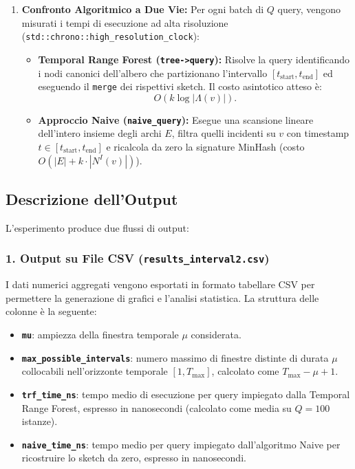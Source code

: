 \begin{enumerate}
    \item \textbf{Confronto Algoritmico a Due Vie:}
    Per ogni batch di $Q$ query, vengono misurati i tempi di esecuzione ad alta risoluzione (\texttt{std::chrono::high\_resolution\_clock}):
    \begin{itemize}
        \item \textbf{Temporal Range Forest (\texttt{tree->query}):} Risolve la query identificando i nodi canonici dell'albero che partizionano l'intervallo $[t_{\text{start}}, t_{\text{end}}]$ ed eseguendo il \texttt{merge} dei rispettivi sketch. Il costo asintotico atteso è:
        \[
        O(k \log |\Lambda(v)|).
        \]
        \item \textbf{Approccio Naive (\texttt{naive\_query}):} Esegue una scansione lineare dell'intero insieme degli archi $E$, filtra quelli incidenti su $v$ con timestamp $t \in [t_{\text{start}}, t_{\text{end}}]$ e ricalcola da zero la signature MinHash (costo $O(|E| + k \cdot |N^I(v)|)$).
    \end{itemize}
\end{enumerate}

\subsection{Descrizione dell'Output}
L'esperimento produce due flussi di output:

\subsubsection{1. Output su File CSV (\texttt{results\_interval2.csv})}
I dati numerici aggregati vengono esportati in formato tabellare CSV per permettere la generazione di grafici e l'analisi statistica. La struttura delle colonne è la seguente:
\begin{itemize}
    \item \textbf{\texttt{mu}}: ampiezza della finestra temporale $\mu$ considerata.
    \item \textbf{\texttt{max\_possible\_intervals}}: numero massimo di finestre distinte di durata $\mu$ collocabili nell'orizzonte temporale $[1, T_{\max}]$, calcolato come $T_{\max} - \mu + 1$.
    \item \textbf{\texttt{trf\_time\_ns}}: tempo medio di esecuzione per query impiegato dalla Temporal Range Forest, espresso in nanosecondi (calcolato come media su $Q = 100$ istanze).
    \item \textbf{\texttt{naive\_time\_ns}}: tempo medio per query impiegato dall'algoritmo Naive per ricostruire lo sketch da zero, espresso in nanosecondi.
\end{itemize}

